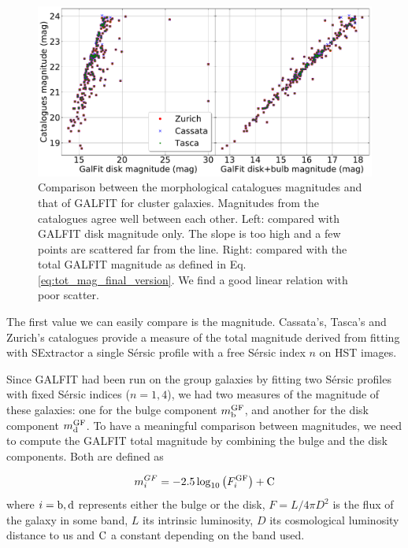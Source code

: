 \begin{figure}[htbp]
	\includegraphics[width=\linewidth]{../Plots/catalogMag_against_GalfitMag_corrected.pdf}
	\caption[Comparison between magnitudes]{Comparison between the morphological catalogues magnitudes and that of GALFIT for cluster galaxies. Magnitudes from the catalogues agree well between each other. Left: compared with GALFIT disk magnitude only. The slope is too high and a few points are scattered far from the line. Right: compared with the total GALFIT magnitude as defined in Eq.\,\ref{eq:tot_mag_final_version}. We find a good linear relation with poor scatter.}
	\label{fig:comp_mags}
\end{figure}

The first value we can easily compare is the magnitude. Cassata's, Tasca's and Zurich's catalogues provide a measure of the total magnitude derived from fitting with SExtractor a single Sérsic profile with a free Sérsic index $n$ on HST images.

Since GALFIT had been run on the group galaxies by fitting two Sérsic profiles with fixed Sérsic indices ($n = 1, 4$), we had two measures of the magnitude of these galaxies: one for the bulge component $m_{\rm{b}}^{\rm{GF}}$, and another for the disk component $m_{\rm{d}}^{\rm{GF}}$. To have a meaningful comparison between magnitudes, we need to compute the GALFIT total magnitude by combining the bulge and the disk components. Both are defined as

\begin{equation}
	m_i^{GF} = -2.5 \log_{10} \left ( F_i^{\rm{GF}} \right ) + \rm{C}
	\label{eq:disk_bulge_lum}
\end{equation}
 where $i = \rm{b, d}$ represents either the bulge or the disk, $F = L/{4 \pi D^2}$ is the flux of the galaxy in some band, $L$ its intrinsic luminosity, $D$ its cosmological luminosity distance to us and $\rm{C}$ a constant depending on the band used.


